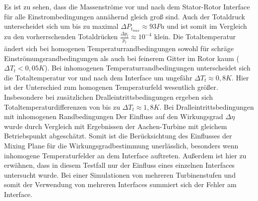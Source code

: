 Es ist zu sehen, dass die Massenströme vor und nach dem Stator-Rotor Interface für alle Einstrombedingungen annähernd gleich groß sind. Auch der Totaldruck unterscheidet sich um bis zu maximal $\Delta P_{t_{max}} \approx 93 Pa$ und ist somit im Vergleich zu den vorherrschenden Totaldrücken $\frac{\Delta p_t}{p_t} \approx 10^{-4}$ klein. \newline Die Totaltemperatur ändert sich bei homogenen Temperaturrandbedingungen sowohl für schräge Einströmungsrandbedingungen als auch bei feinerem Gitter im Rotor kaum ($\Delta T_t < 0,05 K$). \newline
Bei inhomogenen Temperaturrandbedingungen unterscheidet sich die Totaltemperatur vor und nach dem Interface um ungefähr $\Delta T_t \approx 0,8K$. Hier ist der Unterschied zum homogenen Temperaturfeld wesentlich größer. Insbesondere bei zusätzlichen Dralleintrittsbedingungen  ergeben sich Totaltemperaturdifferenzen von bis zu $\Delta T_t \approx 1,8K$. Bei Dralleintrittsbedingungen mit inhomogenen Randbedingungen\newline
Der Einfluss auf den Wirkungsgrad $\Delta \eta$ wurde durch Vergleich mit Ergebnissen der Aachen-Turbine mit gleichem Betriebspunkt abgeschätzt. 
Somit ist die Berücksichtung des Einflusses der Mixing Plane für die Wirkungsgradbestimmung unerlässlich, besonders wenn inhomogene Temperaturfelder an dem Interface auftreten. Außerdem ist hier zu erwähnen, dass in diesem Testfall nur der Einfluss eines einzelnen Interfaces untersucht wurde. Bei einer Simulationen von mehreren Turbinenstufen und somit der Verwendung von mehreren Interfaces summiert sich der Fehler am Interface.



